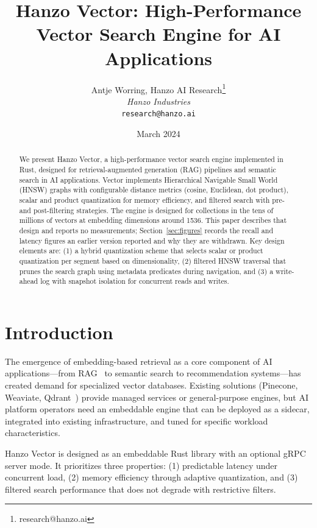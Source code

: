 \documentclass[11pt,twocolumn]{article}
\title{Hanzo Vector: High-Performance Vector Search Engine for AI Applications}
\author{Antje Worring, Hanzo AI Research\thanks{research@hanzo.ai} \\ \textit{Hanzo Industries} \\ \texttt{research@hanzo.ai}}
\date{March 2024}
\begin{document}
\hanzocoverpage

\begin{abstract}
We present Hanzo Vector, a high-performance vector search engine implemented in Rust, designed for retrieval-augmented generation (RAG) pipelines and semantic search in AI applications. Vector implements Hierarchical Navigable Small World (HNSW) graphs with configurable distance metrics (cosine, Euclidean, dot product), scalar and product quantization for memory efficiency, and filtered search with pre- and post-filtering strategies. The engine is designed for collections in the tens of millions of vectors at embedding dimensions around 1536. This paper describes that design and reports no measurements; Section~\ref{sec:figures} records the recall and latency figures an earlier version reported and why they are withdrawn. Key design elements are: (1) a hybrid quantization scheme that selects scalar or product quantization per segment based on dimensionality, (2) filtered HNSW traversal that prunes the search graph using metadata predicates during navigation, and (3) a write-ahead log with snapshot isolation for concurrent reads and writes.
\end{abstract}

\section{Introduction}

The emergence of embedding-based retrieval as a core component of AI applications---from RAG~\cite{lewis2020} to semantic search to recommendation systems---has created demand for specialized vector databases. Existing solutions (Pinecone, Weaviate, Qdrant~\cite{qdrant2021}) provide managed services or general-purpose engines, but AI platform operators need an embeddable engine that can be deployed as a sidecar, integrated into existing infrastructure, and tuned for specific workload characteristics.

Hanzo Vector is designed as an embeddable Rust library with an optional gRPC server mode. It prioritizes three properties: (1) predictable latency under concurrent load, (2) memory efficiency through adaptive quantization, and (3) filtered search performance that does not degrade with restrictive filters.
\end{document}
